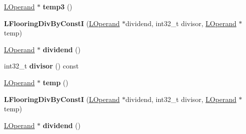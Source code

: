 \begin{DoxyCompactItemize}
\item 
\hyperlink{classv8_1_1internal_1_1_l_operand}{L\+Operand} $\ast$ {\bfseries temp3} ()\hypertarget{classv8_1_1internal_1_1_l_flooring_div_by_const_i_a543b3996a7541e9fb40b9ee3b9fcedef}{}\label{classv8_1_1internal_1_1_l_flooring_div_by_const_i_a543b3996a7541e9fb40b9ee3b9fcedef}

\item 
{\bfseries L\+Flooring\+Div\+By\+ConstI} (\hyperlink{classv8_1_1internal_1_1_l_operand}{L\+Operand} $\ast$dividend, int32\+\_\+t divisor, \hyperlink{classv8_1_1internal_1_1_l_operand}{L\+Operand} $\ast$temp)\hypertarget{classv8_1_1internal_1_1_l_flooring_div_by_const_i_ae250f828f1300817ff62968952e8d1bf}{}\label{classv8_1_1internal_1_1_l_flooring_div_by_const_i_ae250f828f1300817ff62968952e8d1bf}

\item 
\hyperlink{classv8_1_1internal_1_1_l_operand}{L\+Operand} $\ast$ {\bfseries dividend} ()\hypertarget{classv8_1_1internal_1_1_l_flooring_div_by_const_i_afd6eec483f06b84f2130f69d1bdb0663}{}\label{classv8_1_1internal_1_1_l_flooring_div_by_const_i_afd6eec483f06b84f2130f69d1bdb0663}

\item 
int32\+\_\+t {\bfseries divisor} () const \hypertarget{classv8_1_1internal_1_1_l_flooring_div_by_const_i_af9d8b07c5bf6feee1c070b62089c5bd2}{}\label{classv8_1_1internal_1_1_l_flooring_div_by_const_i_af9d8b07c5bf6feee1c070b62089c5bd2}

\item 
\hyperlink{classv8_1_1internal_1_1_l_operand}{L\+Operand} $\ast$ {\bfseries temp} ()\hypertarget{classv8_1_1internal_1_1_l_flooring_div_by_const_i_afcfe0e19c33badfb035d72c047c00aa7}{}\label{classv8_1_1internal_1_1_l_flooring_div_by_const_i_afcfe0e19c33badfb035d72c047c00aa7}

\item 
{\bfseries L\+Flooring\+Div\+By\+ConstI} (\hyperlink{classv8_1_1internal_1_1_l_operand}{L\+Operand} $\ast$dividend, int32\+\_\+t divisor, \hyperlink{classv8_1_1internal_1_1_l_operand}{L\+Operand} $\ast$temp)\hypertarget{classv8_1_1internal_1_1_l_flooring_div_by_const_i_ae250f828f1300817ff62968952e8d1bf}{}\label{classv8_1_1internal_1_1_l_flooring_div_by_const_i_ae250f828f1300817ff62968952e8d1bf}

\item 
\hyperlink{classv8_1_1internal_1_1_l_operand}{L\+Operand} $\ast$ {\bfseries dividend} ()\hypertarget{classv8_1_1internal_1_1_l_flooring_div_by_const_i_afd6eec483f06b84f2130f69d1bdb0663}{}\label{classv8_1_1internal_1_1_l_flooring_div_by_const_i_afd6eec483f06b84f2130f69d1bdb0663}


\end{DoxyCompactItemize}
